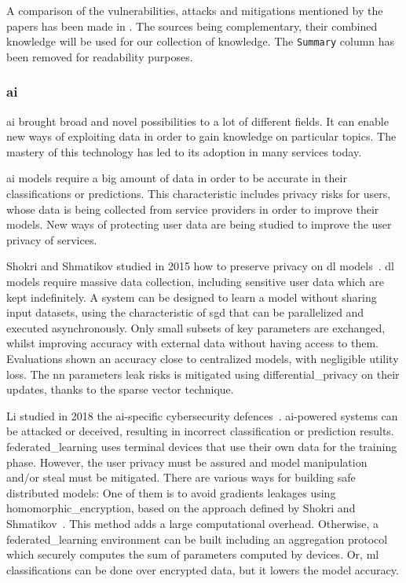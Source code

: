 A comparison of the vulnerabilities, attacks and mitigations mentioned by the papers has been made in . The sources being complementary, their combined knowledge will be used for our collection of knowledge. The \texttt{Summary} column has been removed for readability purposes.

\subsubsection{\acrlong*{ai}}
\label{subsubsec:state_review_results_artificialintelligence}

\gls{ai} brought broad and novel possibilities to a lot of different fields. It can enable new ways of exploiting data in order to gain knowledge on particular topics. The mastery of this technology has led to its adoption in many services today.

\gls{ai} models require a big amount of data in order to be accurate in their classifications or predictions. This characteristic includes privacy risks for users, whose data is being collected from service providers in order to improve their models. New ways of protecting user data are being studied to improve the user privacy of services. 

Shokri and Shmatikov studied in 2015 how to preserve privacy on \gls{dl} models~\cite{shokri_privacy-preserving_2015}. \gls{dl} models require massive data collection, including sensitive user data which are kept indefinitely. A system can be designed to learn a model without sharing input datasets, using the characteristic of \gls{sgd} that can be parallelized and executed asynchronously. Only small subsets of key \gls{parameters} are exchanged, whilst improving accuracy with external data without having access to them. Evaluations shown an accuracy close to centralized models, with negligible utility loss. The \gls{nn} \gls{parameters} leak risks is mitigated using \gls{differential_privacy} on their updates, thanks to the sparse vector technique. %

Li studied in 2018 the \gls{ai}-specific cybersecurity defences~\cite{li_cyber_2018}. \gls{ai}-powered systems can be attacked or deceived, resulting in incorrect classification or prediction results. \Gls{federated_learning} uses terminal devices that use their own data for the training phase. However, the user privacy must be assured and model manipulation and/or steal must be mitigated. There are various ways for building safe distributed models: One of them is to avoid \glspl{gradient} leakages using \gls{homomorphic_encryption}, based on the approach defined by Shokri and Shmatikov~\cite{shokri_privacy-preserving_2015}. This method adds a large computational overhead. Otherwise, a \gls{federated_learning} environment can be built including an aggregation protocol which securely computes the sum of \gls{parameters} computed by devices. Or, \gls{ml} classifications can be done over encrypted data, but it lowers the model accuracy. %

